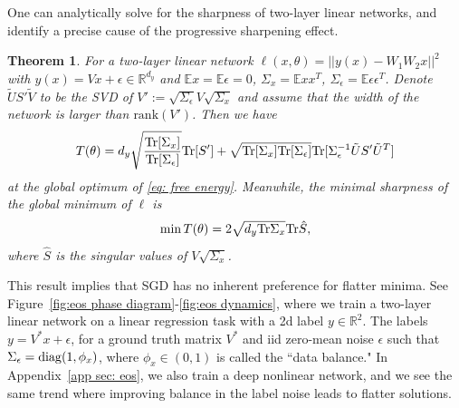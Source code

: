 \documentclass{article}
\theoremstyle{plain}
\newtheorem{theorem}{Theorem}
\newcommand{\E}{\mathbb{E}}
\newcommand{\Tr}{{\rm Tr}}
\begin{document}
One can analytically solve for the sharpness of two-layer linear networks, and identify a precise cause of the progressive sharpening effect. 
\begin{theorem}\label{theo: sharpness}
For a two-layer linear network $\ell(x,\theta)=||y(x)-W_1W_2x||^2$ with $y(x)=Vx+\epsilon\in\mathbb{R}^{d_y}$ and $\E x=\E\epsilon=0$, $\Sigma_x=\E xx^T$, $\Sigma_\epsilon=\E\epsilon\epsilon^T$. Denote $\tilde{U}S'\tilde{V}$ to be the SVD of $V':=\sqrt{\Sigma_\epsilon}V\sqrt{\Sigma_x}$ and assume that the width of the network is larger than $\text{rank}(V')$. Then we have
\begin{equation}
T(\theta)=d_y\sqrt{\frac{\Tr[\Sigma_x]}{\Tr[\Sigma_\epsilon]}}\Tr[S']+\sqrt{\Tr[\Sigma_x]\Tr[\Sigma_\epsilon]}\Tr[\Sigma_\epsilon^{-1}\tilde{U}S'\tilde{U}^T]
\end{equation}
at the global optimum of \eqref{eq: free energy}. Meanwhile, the minimal sharpness of the global minimum of $\ell$ is
\begin{equation}
\min T(\theta)=2\sqrt{d_y\Tr\Sigma_x}\Tr\hat{S},
\label{eq:S}
\end{equation}
where $\hat{S}$ is the singular values of $V\sqrt{\Sigma_x}$.
\end{theorem}


This result implies that SGD has no inherent preference for flatter minima. See Figure~\ref{fig:eos phase diagram}-\ref{fig:eos dynamics}, where we train a two-layer linear network on a linear regression task with a 2d label $y\in\mathbb{R}^2$. The labels $y= V^*x +\epsilon$, for a ground truth matrix $V^*$ and iid zero-mean noise $\epsilon$ such that $\Sigma_\epsilon={\rm diag}(1, \phi_x)$, where $\phi_x \in (0, 1)$ is called the ``data balance." In Appendix~\ref{app sec: eos}, we also train a deep nonlinear network, and we see the same trend where improving balance in the label noise leads to flatter solutions.
\end{document}
